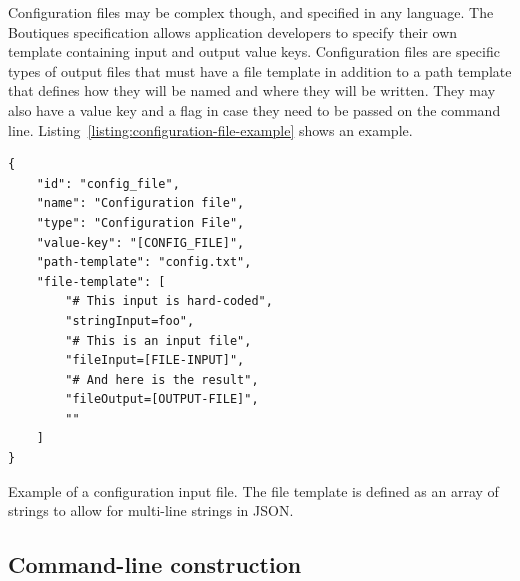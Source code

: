 \documentclass[a4paper,num-refs]{oup-contemporary}
\newcommand{\boutiques}{Boutiques\xspace}
\begin{document}
Configuration files may be complex though, and specified in any
language.  The \boutiques specification allows application developers
to specify their own template containing input and output value
keys. Configuration files are specific types of output files that must
have a file template in addition to a path template that defines how
they will be named and where they will be written. They may also have
a value key and a flag in case they need to be passed on the command
line. Listing~\ref{listing:configuration-file-example} shows an
example.
\begin{listing}
\begin{verbatim}
{
    "id": "config_file",
    "name": "Configuration file",
    "type": "Configuration File",
    "value-key": "[CONFIG_FILE]",
    "path-template": "config.txt",
    "file-template": [
        "# This input is hard-coded",
        "stringInput=foo",
        "# This is an input file",
        "fileInput=[FILE-INPUT]",
        "# And here is the result",
        "fileOutput=[OUTPUT-FILE]",
        ""
    ]
}
\end{verbatim}
\caption{Example of a configuration input file. The file template is defined as
  an array of strings to allow for multi-line strings in JSON.}
\label{listing:configuration-file-example}
\end{listing}

\subsection{Command-line construction}
\end{document}
